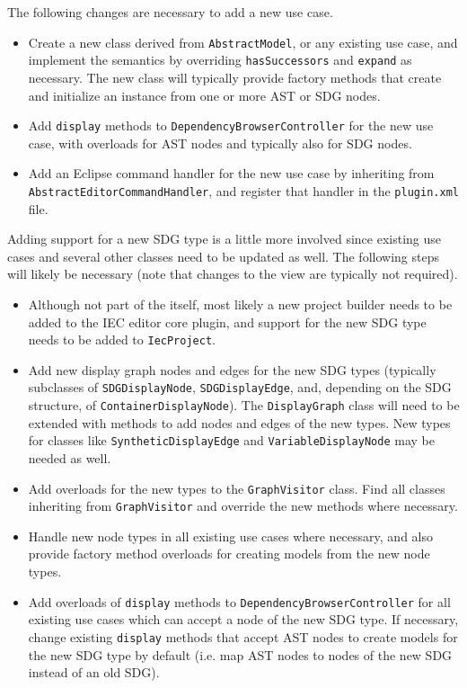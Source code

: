 The following changes are necessary to add a new use case.
\begin{itemize}
  \item Create a new class derived from \lstinline|AbstractModel|, or any existing use case, and implement the 
  semantics by overriding \lstinline|hasSuccessors| and \lstinline|expand| as necessary. The new class will typically 
  provide factory methods that create and initialize an instance from one or more AST or SDG nodes.
  
  \item Add \lstinline|display| methods to \lstinline|DependencyBrowserController| for the new use case, with overloads 
  for AST nodes and typically also for SDG nodes.
  
  \item Add an Eclipse command handler for the new use case by inheriting from 
  \lstinline|AbstractEditorCommandHandler|, and register that handler in the \SB \lstinline|plugin.xml| file.
\end{itemize}

Adding support for a new SDG type is a little more involved since existing use cases and several other classes need to 
be updated as well. The following steps will likely be necessary (note that changes to the view are typically not 
required).
\begin{itemize}
  \item Although not part of the \SB itself, most likely a new project builder needs to be added to the IEC editor core 
  plugin, and support for the new SDG type needs to be added to \lstinline|IecProject|.
  
  \item Add new display graph nodes and edges for the new SDG types (typically subclasses of 
  \lstinline|SDGDisplayNode|, \lstinline|SDGDisplayEdge|, and, depending on the SDG structure, of
  \lstinline|ContainerDisplayNode|). The \lstinline|DisplayGraph| class will need to be extended with methods to add 
  nodes and edges of the new types. New types for classes like \lstinline|SyntheticDisplayEdge| and 
  \lstinline|VariableDisplayNode| may be needed as well.
  
  \item Add overloads for the new types to the \lstinline|GraphVisitor| class. Find all classes inheriting from 
  \lstinline|GraphVisitor| and override the new methods where necessary.
  
  \item Handle new node types in all existing use cases where necessary, and also provide factory method overloads for 
  creating models from the new node types.
  
  \item Add overloads of \lstinline|display| methods to \lstinline|DependencyBrowserController| for all existing use 
  cases which can accept a node of the new SDG type. If necessary, change existing \lstinline|display| methods that 
  accept AST nodes to create models for the new SDG type by default (i.e. map AST nodes to nodes of the new SDG instead 
  of an old SDG).
\end{itemize}